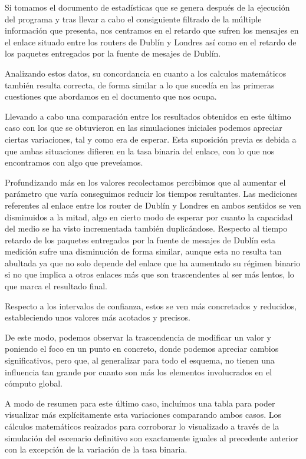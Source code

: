 \documentclass{article}[10pt]
\begin{document}
		Si tomamos el documento de estadísticas que se genera después de la ejecución del programa y tras llevar a cabo el consiguiente filtrado de la múltiple información que presenta, nos centramos en el retardo que sufren los mensajes en el enlace situado entre los routers de Dublín y Londres así como en el retardo de los paquetes entregados por la fuente de mesajes de Dublín.

		Analizando estos datos, su concordancia en cuanto a los calculos matemáticos también resulta correcta, de forma similar a lo que sucedía en las primeras cuestiones que abordamos en el documento que nos ocupa.

		Llevando a cabo una comparación entre los resultados obtenidos en este último caso con los que se obtuvieron en las simulaciones iniciales podemos apreciar ciertas variaciones, tal y como era de esperar. Esta suposición previa es debida a que ambas situaciones difieren en la tasa binaria del enlace, con lo que nos encontramos con algo que preveíamos.

		Profundizando más en los valores recolectamos percibimos que al aumentar el parámetro que varía conseguimos reducir los tiempos resultantes. Las mediciones referentes al enlace entre los router de Dublín y Londres en ambos sentidos se ven disminuidos a la mitad, algo en cierto modo de esperar por cuanto la capacidad del medio se ha visto incrementada también duplicándose. Respecto al tiempo retardo de los paquetes entregados por la fuente de mesajes de Dublín esta medición sufre una disminución de forma similar, aunque esta no resulta tan abultada ya que no solo depende del enlace que ha aumentado su régimen binario si no que implica a otros enlaces más que son trascendentes al ser más lentos, lo que marca el resultado final.

		Respecto a los intervalos de confianza, estos se ven más concretados y reducidos, estableciendo unos valores más acotados y precisos.

		De este modo, podemos observar la trascendencia de modificar un valor y poniendo el foco en un punto en concreto, donde podemos apreciar cambios significativos, pero que, al generalizar para todo el esquema, no tienen una influencia tan grande por cuanto son más los elementos involucrados en el cómputo global.

		A modo de resumen para este último caso, incluímos una tabla para poder visualizar más explícitamente esta variaciones comparando ambos casos. Los cálculos matemáticos reaizados para corroborar lo visualizado a través de la simulación del escenario definitivo son exactamente iguales al precedente anterior con la excepción de la variación de la tasa binaria.
\end{document}
